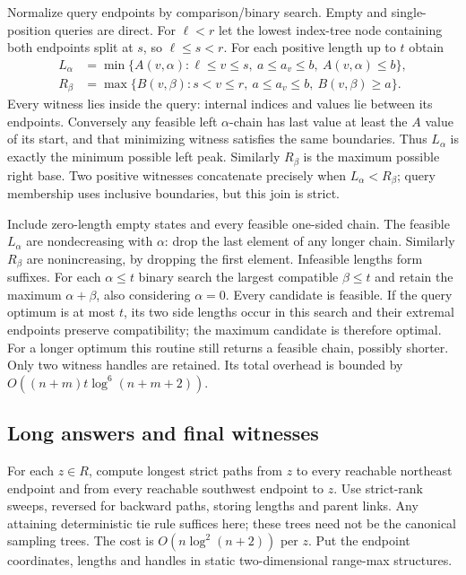 \documentclass[acmsmall,11pt,nonacm,natbib=false]{acmart}
\begin{document}
Normalize query endpoints by comparison/binary search. Empty and
single-position queries are direct. For $\ell<r$ let the lowest index-tree
node containing both endpoints split at $s$, so $\ell\leq s<r$. For each
positive length up to $t$ obtain
\begin{align*}
 L_\alpha&=\min\{A(v,\alpha):\ell\leq v\leq s,\ a\leq a_v\leq b,
                                      \ A(v,\alpha)\leq b\},\\
 R_\beta&=\max\{B(v,\beta):s<v\leq r,\ a\leq a_v\leq b,
                                      \ B(v,\beta)\geq a\}.
\end{align*}
Every witness lies inside the query: internal indices and values lie
between its endpoints. Conversely any feasible left $\alpha$-chain has
last value at least the $A$ value of its start, and that minimizing witness
satisfies the same boundaries. Thus $L_\alpha$ is exactly the minimum
possible left peak. Similarly $R_\beta$ is the maximum possible right base.
Two positive witnesses concatenate precisely when $L_\alpha<R_\beta$;
query membership uses inclusive boundaries, but this join is strict.

Include zero-length empty states and every feasible one-sided chain.
The feasible $L_\alpha$ are nondecreasing with $\alpha$: drop the last
element of any longer chain. Similarly $R_\beta$ are nonincreasing, by
dropping the first element. Infeasible lengths form suffixes. For each
$\alpha\leq t$ binary search the largest compatible $\beta\leq t$ and
retain the maximum $\alpha+\beta$, also considering $\alpha=0$.
Every candidate is feasible. If the query optimum is at most $t$, its two
side lengths occur in this search and their extremal endpoints preserve
compatibility; the maximum candidate is therefore optimal. For a longer
optimum this routine still returns a feasible chain, possibly shorter.
Only two witness handles are retained. Its total overhead is bounded by
$O((n+m)t\log^6(n+m+2))$.

\subsection{Long answers and final witnesses}
For each $z\in R$, compute longest strict paths from $z$ to every reachable
northeast endpoint and from every reachable southwest endpoint to $z$.
Use strict-rank sweeps, reversed for backward paths, storing lengths and
parent links. Any attaining deterministic tie rule suffices here; these
trees need not be the canonical sampling trees. The cost is
$O(n\log^2(n+2))$ per $z$. Put the endpoint coordinates, lengths and
handles in static two-dimensional range-max structures.
\end{document}
